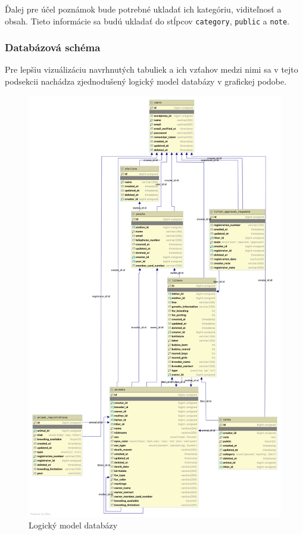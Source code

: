 Ďalej pre účel poznámok bude potrebné ukladať ich kategóriu, viditeľnosť a obsah. Tieto informácie sa budú ukladať do stĺpcov \texttt{category}, \texttt{public} a \texttt{note}.

\pagebreak

\subsubsection{Databázová schéma}
Pre lepšiu vizuálizáciu navrhnutých tabuliek a ich vzťahov medzi nimi sa v tejto podsekcii nachádza zjednodušený logický model databázy v grafickej podobe.

\begin{figure}[H]
	\includegraphics[width=1.0\textwidth]{media/navrh/diagram.png}
	\caption{Logický model databázy}
\end{figure}
